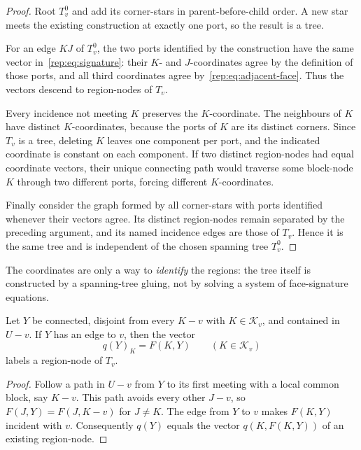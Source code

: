 \begin{proof}
Root $T^0_v$ and add its corner-stars in parent-before-child order.  A
new star meets the existing construction at exactly one port, so the
result is a tree.

For an edge $KJ$ of $T^0_v$, the two ports identified by the
construction have the same vector in~\eqref{rep:eq:signature}: their
$K$- and $J$-coordinates agree by the definition of those ports, and
all third coordinates agree by~\eqref{rep:eq:adjacent-face}.  Thus the
vectors descend to region-nodes of $T_v$.

Every incidence not meeting $K$ preserves the $K$-coordinate.  The
neighbours of $K$ have distinct $K$-coordinates, because the ports of
$K$ are its distinct corners.  Since $T_v$ is a tree, deleting $K$
leaves one component per port, and the indicated coordinate is constant
on each component.  If two distinct region-nodes had equal coordinate
vectors, their unique connecting path would traverse some block-node
$K$ through two different ports, forcing different $K$-coordinates.

Finally consider the graph formed by all corner-stars with ports
identified whenever their vectors agree.  Its distinct region-nodes
remain separated by the preceding argument, and its named incidence
edges are those of $T_v$.  Hence it is the same tree and is independent
of the chosen spanning tree $T^0_v$.
\end{proof}

The coordinates are only a way to \emph{identify} the regions: the tree
itself is constructed by a spanning-tree gluing, not by solving a system
of face-signature equations.

\begin{lemma}
\label{rep:lem:unmarked-block-signature}
Let $Y$ be connected, disjoint from every $K-v$ with
$K\in\mathcal K_v$, and contained in $U-v$.  If $Y$ has an edge to $v$,
then the vector
\[
 q(Y)_K=F(K,Y)\qquad(K\in\mathcal K_v)
\]
labels a region-node of $T_v$.
\end{lemma}
\begin{proof}
Follow a path in $U-v$ from $Y$ to its first meeting with a local
common block, say $K-v$.  This path avoids every other $J-v$, so
$F(J,Y)=F(J,K-v)$ for $J\ne K$.  The edge from $Y$ to $v$ makes
$F(K,Y)$ incident with $v$.  Consequently $q(Y)$ equals the vector
$q(K,F(K,Y))$ of an existing region-node.
\end{proof}

